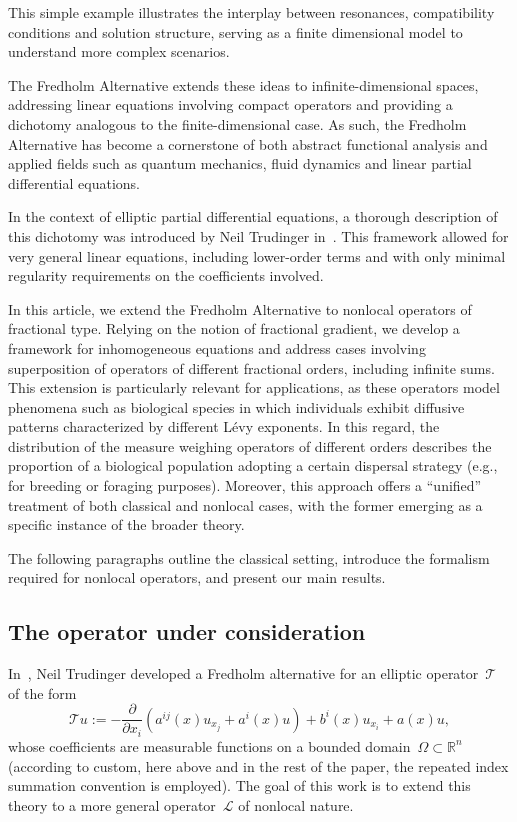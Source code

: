 \documentclass[11pt,hyp,]{nyjm}
\numberwithin{equation}{section}
\newcommand{\R}{\mathbb{R}}
\theoremstyle{remark}
\begin{document}
 This simple example illustrates the interplay between resonances, compatibility conditions and solution structure, serving as a finite dimensional model to understand more complex scenarios.

The Fredholm Alternative extends these ideas to infinite-dimensional spaces, addressing linear equations involving compact operators and providing a dichotomy analogous to the finite-dimensional case. As such, the Fredholm Alternative has become a cornerstone of both abstract functional analysis and applied fields such as quantum mechanics, fluid dynamics and linear partial differential equations.

 In the context of  elliptic partial differential equations, a thorough description of this dichotomy was introduced by Neil Trudinger in~\cite{trudinger}. This framework allowed for very general linear equations, including lower-order terms and with only minimal regularity requirements on the coefficients involved.

In this article, we extend the Fredholm Alternative to nonlocal operators of fractional type. Relying on the notion of fractional gradient, we develop a framework for inhomogeneous equations and address cases involving superposition of operators of different fractional orders, including infinite sums. This extension is particularly relevant for applications, as these operators model phenomena such as biological species in which individuals exhibit diffusive patterns characterized by different L\'evy exponents. 
In this regard, the distribution of the measure weighing operators of different orders describes the proportion of a biological population adopting a certain dispersal strategy (e.g., for breeding or foraging purposes).
Moreover, this approach offers a ``unified'' treatment of both classical and nonlocal cases, with the former emerging as a specific instance of the broader theory.

The following paragraphs outline the classical setting, introduce the formalism required for nonlocal operators, and present our main results.


\subsection{The operator under consideration}\label{opISPJDL}
In~\cite{trudinger},
Neil Trudinger developed a Fredholm alternative for an elliptic operator~$\mathcal{T}$ of the form
\begin{equation}\label{trudingi}
	\mathcal{T} u:=  -\frac{\partial}{\partial x_i} \left( a^{ij}(x) u_{x_j} + a^i(x) u \right) + b^i(x) u_{x_i} + a(x) u, 
\end{equation}
whose coefficients are measurable functions on a bounded domain~$\Omega \subset \R^n$
(according to custom, here above and in the rest of the paper, the repeated index summation
convention is employed). The goal of this work is to extend this theory to a more general operator~$\mathcal{L}$ of nonlocal nature.
\end{document}
